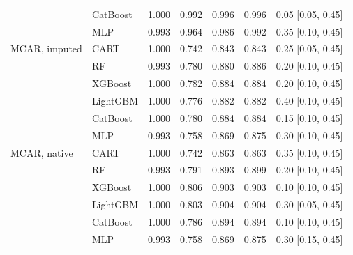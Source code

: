 \documentclass[pdflatex,sn-mathphys]{sn-jnl}
\theoremstyle{thmstyleone}
\begin{document}
\begin{table}[htbp]
\begin{tabular}{@{}llrrrrl@{}}
 & CatBoost & 1.000 & 0.992 & 0.996 & 0.996 & 0.05 [0.05, 0.45] \\
 & MLP & 0.993 & 0.964 & 0.986 & 0.992 & 0.35 [0.10, 0.45] \\
\midrule
MCAR, imputed & CART & 1.000 & 0.742 & 0.843 & 0.843 & 0.25 [0.05, 0.45] \\
 & RF & 0.993 & 0.780 & 0.880 & 0.886 & 0.20 [0.10, 0.45] \\
 & XGBoost & 1.000 & 0.782 & 0.884 & 0.884 & 0.20 [0.10, 0.45] \\
 & LightGBM & 1.000 & 0.776 & 0.882 & 0.882 & 0.40 [0.10, 0.45] \\
 & CatBoost & 1.000 & 0.780 & 0.884 & 0.884 & 0.15 [0.10, 0.45] \\
 & MLP & 0.993 & 0.758 & 0.869 & 0.875 & 0.30 [0.10, 0.45] \\
\midrule
MCAR, native & CART & 1.000 & 0.742 & 0.863 & 0.863 & 0.35 [0.10, 0.45] \\
 & RF & 0.993 & 0.791 & 0.893 & 0.899 & 0.20 [0.10, 0.45] \\
 & XGBoost & 1.000 & 0.806 & 0.903 & 0.903 & 0.10 [0.10, 0.45] \\
 & LightGBM & 1.000 & 0.803 & 0.904 & 0.904 & 0.30 [0.05, 0.45] \\
 & CatBoost & 1.000 & 0.786 & 0.894 & 0.894 & 0.10 [0.10, 0.45] \\
 & MLP & 0.993 & 0.758 & 0.869 & 0.875 & 0.30 [0.15, 0.45] \\
\bottomrule
\end{tabular}
\end{table}
\end{document}

